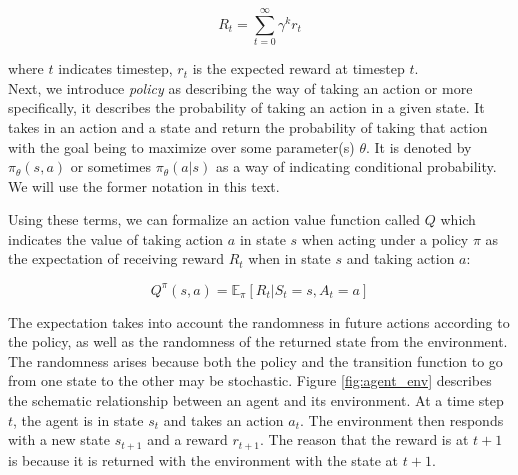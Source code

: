 \documentclass[acmsmall,review,authorversion]{acmart}
\begin{document}
\begin{equation}
\label{eq:reward}
    R_t = \sum_{t=0}^{\infty} \gamma^k r_t
\end{equation}

\noindent where $t$ indicates timestep, \emph{$r_t$} is the expected reward at timestep $t$. \\

Next, we introduce \emph{policy} as describing the way of taking an action or more specifically, it describes the probability of taking an action in a given state. It takes in an action and a state and return the probability of taking that action with the goal being to maximize over some parameter(s) $\theta$. It is denoted by $\pi_{\theta}(s,a)$ or sometimes $\pi_{\theta}(a|s)$ as a way of indicating conditional probability. We will use the former notation in this text.

Using these terms, we can formalize an action value function called $Q$ which indicates the value of taking action $a$ in state $s$ when acting under a policy $\pi$ as the expectation of receiving reward $R_t$ when in state $s$ and taking action $a$:

\begin{equation}
\label{eq:q_function}
    Q^\pi (s, a) = \mathbb{E}_\pi [R_t|S_t = s, A_t = a]    
\end{equation}

The expectation takes into account the randomness in future actions according to the policy, as well as the randomness of the returned state from the environment. The randomness arises because both the policy and the transition function to go from one state to the other may be stochastic. Figure \ref{fig:agent_env} describes the schematic relationship between an agent and its environment. At a time step $t$, the agent is in state $s_t$ and takes an action $a_t$. The environment then responds with a new state $s_{t+1}$ and a reward $r_{t+1}$. The reason that the reward is at $t+1$ is because it is returned with the environment with the state at $t+1$. 
\end{document}
